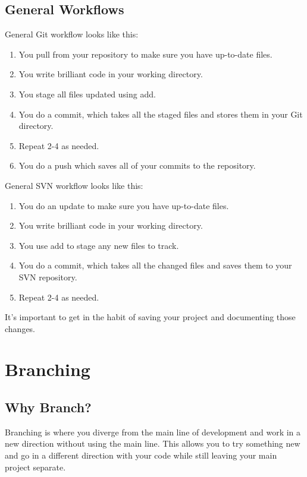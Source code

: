 \documentclass[oneside]{book}
\begin{document}
\section{General Workflows}
\vspace{5mm}
\Large
General Git workflow looks like this:
\normalsize
\begin{enumerate}
    \item You pull from your repository to make sure you have up-to-date files.
    \item You write brilliant code in your working directory.
    \item You stage all files updated using add.
    \item You do a commit, which takes all the staged files and stores them in your Git directory.
    \item Repeat 2-4 as needed.
    \item You do a push which saves all of your commits to the repository. 
\end{enumerate}
\vspace{5mm}
\Large
General SVN workflow looks like this:
\normalsize
\begin{enumerate}
    \item You do an update to make sure you have up-to-date files.
    \item You write brilliant code in your working directory.
    \item You use add to stage any new files to track.
    \item You do a commit, which takes all the changed files and saves them to your SVN repository.
    \item Repeat 2-4 as needed.
\end{enumerate}
\vspace{5mm}
It's important to get in the habit of saving your project and documenting those changes.


\chapter{Branching}
\section{Why Branch?}
Branching is where you diverge from the main line of development and work in a new direction without using the main line. This allows you to try something new and go in a different direction with your code while still leaving your main project separate.
\end{document}
